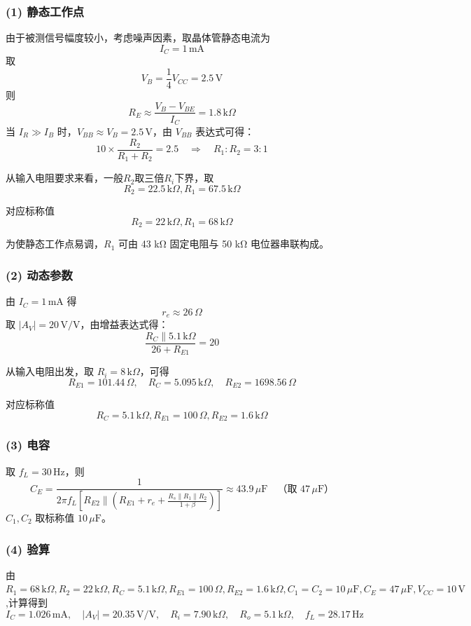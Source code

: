 \documentclass[12pt,a4paper]{article}
\begin{document}
\subsubsection*{(1) 静态工作点}
由于被测信号幅度较小，考虑噪声因素，取晶体管静态电流为
\[
I_C = 1 \,\text{mA}
\]
取
\[
V_B = \frac{1}{4} V_{CC} = 2.5 \,\text{V}
\]
则
\[
R_E \approx \frac{V_B - V_{BE}}{I_C} = 1.8 \,\text{k}\Omega
\]
当 \( I_R \gg I_B \) 时，\( V_{BB} \approx V_B = 2.5 \,\text{V} \)，由 \( V_{BB} \) 表达式可得：
\[
10 \times \frac{R_2}{R_1 + R_2} = 2.5 \quad \Rightarrow \quad R_1 : R_2 = 3 : 1
\]


    从输入电阻要求来看，一般\(R_2\)取三倍\(R_i\)下界，取 \[ R_2 = 22.5 \,\text{k}\Omega , R_1 = 67.5 \,\text{k}\Omega \]


对应标称值 \[ R_2 = 22 \,\text{k}\Omega , R_1 = 68 \,\text{k}\Omega \]

为使静态工作点易调，\( R_1 \) 可由 43 kΩ 固定电阻与 50 kΩ 电位器串联构成。

\subsubsection*{(2) 动态参数}
由 \( I_C = 1 \,\text{mA} \) 得
\[
r_e \approx 26 \,\Omega
\]
取 \( |A_V| = 20 \,\text{V/V} \)，由增益表达式得：
\[
\frac{R_C \parallel 5.1 \,\text{k}\Omega}{26 + R_{E1}} = 20
\]

从输入电阻出发，取 \( R_i = 8 \,\text{k}\Omega \)，可得
    \[
    R_{E1} = 101.44 \,\Omega, \quad R_C = 5.095 \,\text{k}\Omega, \quad R_{E2} = 1698.56 \,\Omega
    \]
    
对应标称值 \[ R_C = 5.1 \,\text{k}\Omega , R_{E1} = 100 \,\Omega,R_{E2} = 1.6 \,\text{k}\Omega \]

\subsubsection*{(3) 电容}
取 \( f_L = 30 \,\text{Hz} \)，则
\[
C_E = \frac{1}{2\pi f_L \left[ R_{E2} \parallel \left( R_{E1} + r_e+\frac{R_s\parallel R_1\parallel R_2}{1+\beta} \right) \right]} \approx 43.9 \,\mu\text{F} \quad \text{（取 } 47 \,\mu\text{F} \text{）}
\]
\( C_1, C_2 \) 取标称值 \( 10 \,\mu\text{F} \)。

\subsubsection*{(4) 验算}
由\(
R_1 = 68 \,\text{k}\Omega, R_2 = 22 \,\text{k}\Omega, R_C = 5.1 \,\text{k}\Omega,  R_{E1} = 100 \,\Omega,  R_{E2} = 1.6 \,\text{k}\Omega
,
C_1 = C_2 = 10 \,\mu\text{F}, C_E = 47 \,\mu\text{F}, V_{CC} = 10 \,\text{V}
\),计算得到
\[
I_C = 1.026 \,\text{mA},  \quad |A_V| = 20.35 \,\text{V/V}, \quad R_i = 7.90 \,\text{k}\Omega, \quad R_o = 5.1 \,\text{k}\Omega,\quad f_L = 28.17 \,\text{Hz}
\]
\end{document}
